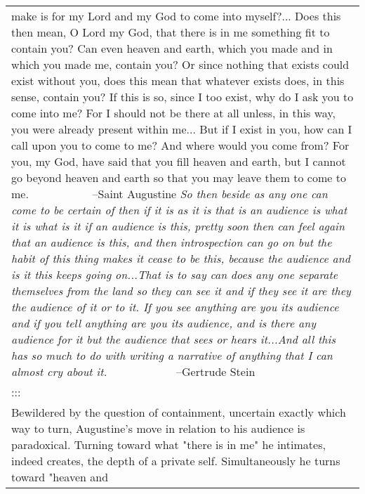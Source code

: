 \begin{longtable}[]{@{}l@{}}
\begin{minipage}[t]{0.97\columnwidth}
{make is for \textbar{} my \textbar{} Lord and my God to come into
myself?... Does this then mean, O Lord \textbar{} my \textbar{} God,
that there is in me something fit to contain you? Can even \textbar{}
heaven \textbar{} and earth, which you made and in which you made me,
contain you? Or \textbar{} since nothing that exists could exist without
you, does this mean \textbar{} that \textbar{} whatever exists does, in
this sense, contain you? If this is so, \textbar{} since \textbar{} I
too exist, why do I ask you to come into me? For I should not be
\textbar{} there at all unless, in this way, you were already present
within \textbar{} me... \textbar{} But if I exist in you, how can I call
upon you to come to me? And \textbar{} where \textbar{} would you come
from? For you, my God, have said that you fill heaven \textbar{} and
earth, but I cannot go beyond heaven and earth so that you may
\textbar{} leave \textbar{} them to come to me.} \textbar{} \textbar{}
~~~~~~~~~~ --Saint Augustine \textbar{} \textbar{} \textbar{} \emph{So
then beside as any one can come to be certain of then if it is as
\textbar{} it \textbar{} is that is an audience is what it is what is it
if an audience is \textbar{} this, \textbar{} pretty soon then can feel
again that an audience is this, and then \textbar{} introspection can go
on but the habit of this thing makes it cease to \textbar{} be
\textbar{} this, because the audience and is it this keeps going
on...That is \textbar{} to \textbar{} say can does any one separate
themselves from the land so they can \textbar{} see \textbar{} it and if
they see it are they the audience of it or to it. If you \textbar{} see
\textbar{} anything are you its audience and if you tell anything are
you its \textbar{} audience, and is there any audience for it but the
audience that sees \textbar{} or \textbar{} hears it...And all this has
so much to do with writing a narrative \textbar{} of \textbar{} anything
that I can almost cry about it.} \textbar{} \textbar{} ~~~~~~~~~~
~--Gertrude Stein\strut
\end{minipage}\tabularnewline
\begin{minipage}[t]{0.97\columnwidth}\raggedright
:::\strut
\end{minipage}\tabularnewline
\begin{minipage}[t]{0.97\columnwidth}\raggedright
Bewildered by the question of containment, uncertain exactly which way
to turn, Augustine's move in relation to his audience is paradoxical.
Turning toward what "there is in me" he intimates, indeed creates, the
depth of a private self. Simultaneously he turns toward "heaven and

\end{minipage}
\end{longtable}
